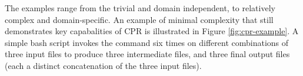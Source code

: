 


The examples range from the trivial and domain independent, to relatively complex and domain-specific.  An example of minimal complexity that still demonstrates key capabalities of CPR is illustrated in Figure \ref{fig:cpr-example}. A simple bash script invokes the  command six times on different combinations of three input files to produce three intermediate files, and three final output files (each a distinct concatenation of the three input files).  

